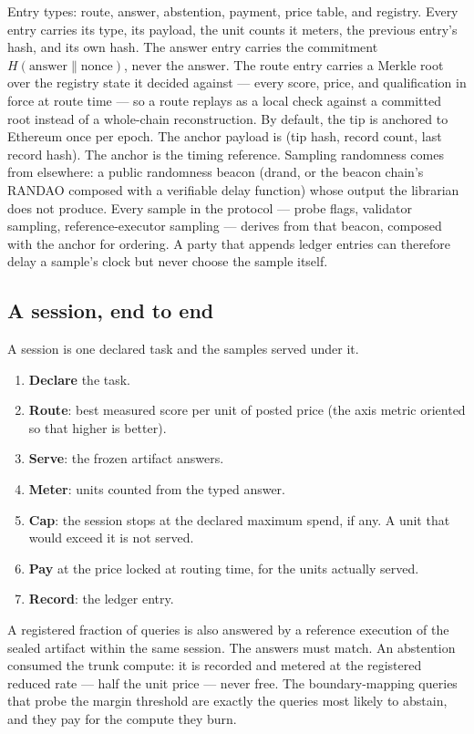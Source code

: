 \documentclass[11pt]{article}
\begin{document}
Entry types: route, answer, abstention, payment, price table, and
registry. Every entry carries its type, its payload, the unit
counts it meters, the previous entry's hash, and its own hash.
The answer entry carries the commitment $H(\text{answer} \|
\text{nonce})$, never the answer. The route entry carries a
Merkle root over the registry state it decided against --- every
score, price, and qualification in force at route time --- so a
route replays as a local check against a committed root instead
of a whole-chain reconstruction.
By default, the tip is anchored to Ethereum once per epoch. The
anchor payload is (tip hash, record count, last record hash).
The anchor is the timing reference. Sampling randomness comes
from elsewhere: a public randomness beacon (drand, or the beacon
chain's RANDAO composed with a verifiable delay function) whose
output the librarian does not produce. Every sample in the
protocol --- probe flags, validator sampling, reference-executor
sampling --- derives from that beacon, composed with the anchor
for ordering. A party that appends ledger entries can therefore
delay a sample's clock but never choose the sample itself.

\subsection{A session, end to end}

A session is one declared task and the samples served under it.
\begin{enumerate}
\item \textbf{Declare} the task.
\item \textbf{Route}: best measured score per unit of posted
price (the axis metric oriented so that higher is better).
\item \textbf{Serve}: the frozen artifact answers.
\item \textbf{Meter}: units counted from the typed answer.
\item \textbf{Cap}: the session stops at the declared maximum
spend, if any. A unit that would exceed it is not served.
\item \textbf{Pay} at the price locked at routing time, for the
units actually served.
\item \textbf{Record}: the ledger entry.
\end{enumerate}
A registered fraction of queries is also answered by a reference
execution of the sealed artifact within the same session. The
answers must match. An abstention consumed the trunk compute: it
is recorded and metered at the registered reduced rate --- half
the unit price --- never free. The boundary-mapping queries that
probe the margin threshold are exactly the queries most likely
to abstain, and they pay for the compute they burn.
\end{document}
